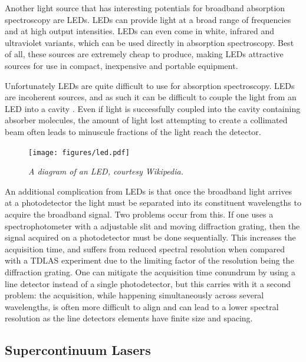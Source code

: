 Another light source that has interesting potentials for broadband absorption
spectroscopy are \acp{LED}. \acp{LED} can provide light at a broad range of
frequencies and at high output intensities. \acp{LED} can even come in white,
infrared and ultraviolet variants, which can be used directly in absorption
spectroscopy. Best of all, these sources are extremely cheap to produce, making
\acp{LED} attractive sources for use in compact, inexpensive and portable
equipment.

Unfortunately \acp{LED} are quite difficult to use for absorption
spectroscopy.  \acp{LED} are incoherent sources, and as such it can be
difficult to couple the light from an \ac{LED} into a
cavity \cite{Seetohul:2009du,Islam:2007ea}. Even if light is successfully
coupled into the cavity containing absorber molecules, the amount of light
lost attempting to create a collimated beam often leads to minuscule fractions
of the light reach the detector.


\begin{figure}
\begin{center}
\texttt{[image: figures/led.pdf]}
\end{center}
\emph{\footnotesize{A diagram of an \ac{LED}, courtesy Wikipedia.}}
\end{figure}

An additional complication from \acp{LED} is that once the broadband light
arrives at a photodetector the light must be separated into its constituent
wavelengths to acquire the broadband signal.  Two problems occur from this. If
one uses a spectrophotometer with a adjustable slit and moving diffraction
grating, then the signal acquired on a photodetector must be done
sequentially.  This increases the acquisition time, and suffers from reduced
spectral resolution when compared with a \ac{TDLAS} experiment due to the
limiting factor of the resolution being the diffraction grating. One can
mitigate the acquisition time conundrum by using a line detector instead of a
single photodetector, but this carries with it a second problem: the
acquisition, while happening simultaneously across several wavelengths, is
often more difficult to align and can lead to a lower spectral resolution as the line detectors elements have finite size and spacing.



\subsection{Supercontinuum Lasers}\label{subsec:super}

